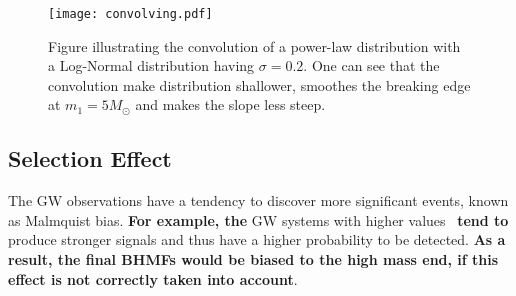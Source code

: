 \documentclass[twocolumn]{aastex62}
\newcommand{\blue}[1]{{\bf #1}}
\begin{document}
\begin{figure}%
\texttt{[image: convolving.pdf]}
\caption{
Figure illustrating the convolution of a power-law distribution with a Log-Normal distribution having $\sigma = 0.2$. One can see that the convolution make distribution shallower, smoothes the breaking edge at $m_1 = 5 M_{\odot}$ and makes the slope less steep.
}
\label{fig:result_slope}
\end{figure}

\subsection{Selection Effect}\label{sec_likelihood_sf}
The GW observations have a tendency to discover more significant events, known as Malmquist bias. \blue{For example, the} GW systems with higher values \mone\ \blue{tend to} produce stronger signals and thus have a higher probability to be detected. \blue{As a result, the final BHMFs would be biased to the high mass end, if this effect is not correctly taken into account}.
\end{document}
